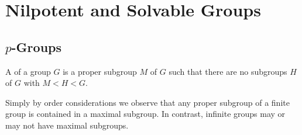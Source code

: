 \documentclass[12pt, a4paper, oneside, openright, titlepage]{book}
\begin{document}
\chapter{\textsection\textsection Nilpotent and Solvable Groups}

\section{\textsection $p$-Groups}

\begin{defn}
    A  of a group $G$ is a proper subgroup $M$ of $G$ such that there are no subgroups $H$ of $G$ with $M < H < G$.
\end{defn}

Simply by order considerations we observe that any proper subgroup of a finite group is contained in a maximal subgroup. In contrast, infinite groups may or may not have maximal subgroups. 
\end{document}
